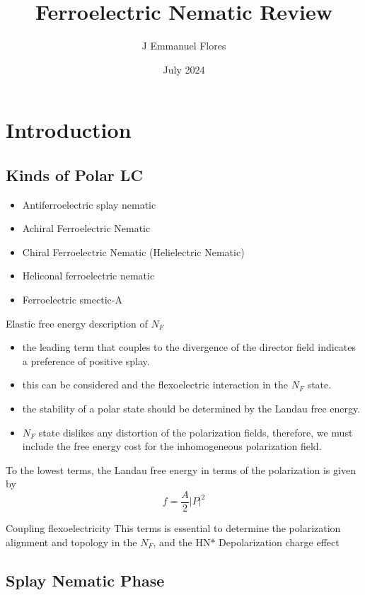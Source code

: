\documentclass{article}
\title{Ferroelectric Nematic Review}
\author{J Emmanuel Flores}
\date{July 2024}
\begin{document}
\maketitle

\section{Introduction}
\subsection{Kinds of Polar LC\cite{zou2024extended}}
\begin{itemize}
    \item Antiferroelectric splay nematic
    \item Achiral Ferroelectric Nematic
    \item Chiral Ferroelectric Nematic (Helielectric Nematic)
    \item Heliconal ferroelectric nematic
    \item Ferroelectric smectic-A
\end{itemize}
Elastic free energy description of $N_{F}$
\begin{itemize}
    \item the leading term that couples to the divergence of the director field indicates a preference of positive splay.
    \item this can be considered and the flexoelectric interaction in the $N_{F}$ state.
    \item the stability of  a polar state should be determined by the Landau free energy.
    \item $N_{F}$ state dislikes any distortion of the polarization fields, therefore, we must include the free energy cost for the inhomogeneous polarization field.
\end{itemize}
To the lowest terms, the Landau free energy in terms of the polarization is given by 
\begin{equation}
    f=\frac{A}{2}|P|^2
\end{equation}

Coupling flexoelectricity
This terms is essential to determine the polarization alignment and topology in the $N_{F}$, and the HN*
Depolarization charge effect

\subsection{Splay Nematic Phase\cite{mertelj2018splay}}
\end{document}

